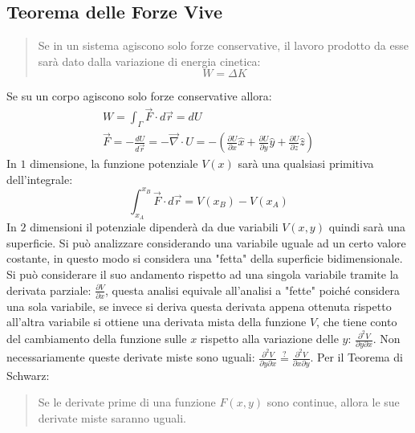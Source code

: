 \documentclass{article}
\numberwithin{equation}{subsection}
\begin{document}
\subsection{Teorema delle Forze Vive}
\begin{quotation}
    Se in un sistema agiscono solo forze conservative, il lavoro
    prodotto da esse sarà dato dalla variazione di energia cinetica:
    \begin{equation}
        W=\Delta K
    \end{equation}
\end{quotation}  

Se su un corpo agiscono solo forze conservative allora:
\begin{gather}
    W=\int_{\Gamma}\vec{F}\cdot d\vec{r}=dU\\
    \vec{F}=-\displaystyle\frac{dU}{d\vec{r}}=-\vec{\nabla}\cdot U=-\left(\displaystyle\frac{\partial U}{\partial x}\hat{x}+\frac{\partial U}{\partial y}\hat{y}+\frac{\partial U}{\partial z}\hat{z}\right)
\end{gather} 
In $1$ dimensione, la funzione potenziale $V(x)$ sarà una qualsiasi 
primitiva dell'integrale:
\begin{equation}
    \displaystyle\int_{x_A}^{x_B}\vec{F}\cdot d\vec{r}=V(x_B)-V(x_A)
\end{equation}
In $2$ dimensioni il potenziale dipenderà da due variabili $V(x,y)$ 
quindi sarà una superficie. Si può analizzare considerando una 
variabile uguale ad un certo valore costante, in questo modo si 
considera una "fetta" della superficie bidimensionale.\\
Si può considerare il suo andamento rispetto ad una singola 
variabile tramite la derivata parziale: $\displaystyle\frac{\partial V}{\partial x}$, 
questa analisi equivale all'analisi a "fette" poiché 
considera una sola variabile, se invece si deriva questa derivata 
appena ottenuta rispetto all'altra variabile si ottiene una derivata 
mista della funzione $V$, che tiene conto del cambiamento della 
funzione sulle $x$ rispetto alla variazione delle $y$: $\displaystyle\frac{\partial^{2} V}{\partial y\partial x}$. 
Non necessariamente queste derivate miste sono uguali: 
$\displaystyle\frac{\partial^{2} V}{\partial y\partial x}\stackrel{?}{=}\displaystyle\frac{\partial^{2} V}{\partial x\partial y}$.
Per il Teorema di Schwarz:
\begin{quotation}
    Se le derivate prime di una funzione $F(x,y)$ sono continue, 
    allora le sue derivate miste saranno uguali.
\end{quotation}
\end{document}
